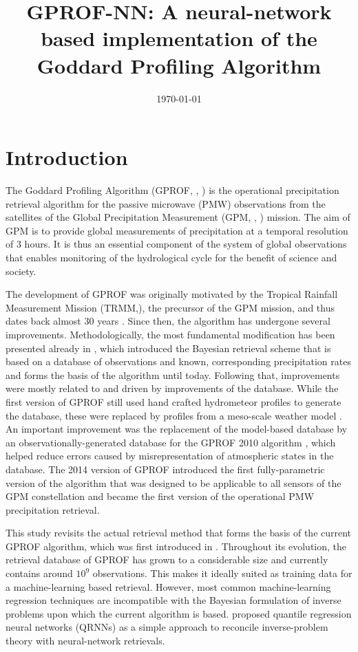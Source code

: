 \documentclass[a4paper,11pt,bibtotoc]{scrartcl}
\begin{document}
\title{GPROF-NN: A neural-network based implementation of the Goddard Profiling Algorithm}
\date{\today}

\maketitle


\section{Introduction}

The Goddard Profiling Algorithm (GPROF, ,
) is the operational precipitation retrieval algorithm for
the passive microwave (PMW) observations from the satellites of the Global
Precipitation Measurement (GPM, , ) mission.
The aim of GPM is to provide global measurements of precipitation at a temporal
resolution of 3 hours. It is thus an essential component of the system of global
observations that enables monitoring of the hydrological cycle for the benefit
of science and society.

The development of GPROF was originally motivated by the Tropical Rainfall
Measurement Mission (TRMM,), the precursor of the GPM mission, and thus dates
back almost 30 years \citep{kummerow94, kummerow96}. Since then, the algorithm
has undergone several improvements. Methodologically, the most fundamental
modification has been presented already in \citet{kummerow96}, which introduced
the Bayesian retrieval scheme that is based on a database of observations and
known, corresponding precipitation rates and forms the basis of the algorithm
until today. Following that, improvements were mostly related to and driven by
improvements of the database. While the first version of GPROF still used hand
crafted hydrometeor profiles to generate the database, these were replaced by
profiles from a meso-scale weather model \citep{kummerow96}. An important
improvement was the replacement of the model-based database by an
observationally-generated database for the GPROF 2010 algorithm
\citep{kummerow11, kummerow15}, which helped reduce errors caused by
misrepresentation of atmospheric states in the database. The 2014 version
of GPROF \citet{kummerow15} introduced the first fully-parametric version
of the algorithm that was designed to be applicable to all sensors of
the GPM constellation and became the first version of the operational
PMW precipitation retrieval.

This study revisits the actual retrieval method that forms the basis of the
current GPROF algorithm, which was first introduced in \citet{kummerow96}.
Throughout its evolution, the retrieval database of GPROF has grown to a
considerable size and currently contains around $10^9$ observations. This makes
it ideally suited as training data for a machine-learning based retrieval.
However, most common machine-learning regression techniques are incompatible
with the Bayesian formulation of inverse problems \citep{rodgers00} upon which
the current algorithm is based. \citet{pfreundschuh18} proposed quantile
regression neural networks (QRNNs) as a simple approach to reconcile
inverse-problem theory with neural-network retrievals.
\end{document}
